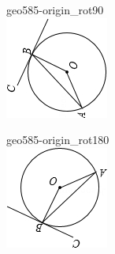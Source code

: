 \documentclass[12pt]{article}
\begin{document}
\begin{center}
\begin{minipage}{0.32\textwidth}
\end{minipage}
\hfill\begin{minipage}{0.32\textwidth}\centering
geo585-origin\_rot90\\
\includegraphics[width=0.95\linewidth]{out_rommath_origin/items/geo585-origin/assets/figure_rot90.png}
\end{minipage}
\par\medskip
\begin{minipage}{0.32\textwidth}\centering
geo585-origin\_rot180\\
\includegraphics[width=0.95\linewidth]{out_rommath_origin/items/geo585-origin/assets/figure_rot180.png}

\end{minipage}
\end{center}
\end{document}
